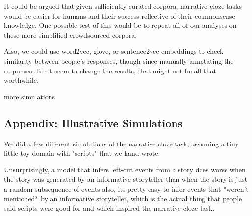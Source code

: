 \documentclass[10pt,a4paper]{article}
\newcommand{\todo}[1]{{\color{red}#1}}
\begin{document}
It could be argued that given sufficiently curated corpora, narrative cloze tasks would be easier for humans and their success reflective of their commonsense knowledge. One possible test of this would be to repeat all of our analyses on these more simplified crowdsourced corpora.

\todo{Also, we could use word2vec, glove, or sentence2vec embeddings to check similarity between people's responses, though since manually annotating the responses didn't seem to change the results, that might not be all that worthwhile.}

\todo{more simulations}





\setlength{\bibleftmargin}{.125in}
\setlength{\bibindent}{-\bibleftmargin}



\subsection{Appendix: Illustrative Simulations}

\todo{
We did a few different simulations of the narrative cloze task, assuming a tiny little toy domain with "scripts" that we hand wrote.

Unsurprisingly,
a model that infers left-out events from a story does worse when the story was generated by an informative storyteller than when the story is just a random subsequence of events
also, its pretty easy to infer events that *weren't mentioned* by an informative storyteller, which is the actual thing that people said scripts were good for and which inspired the narrative cloze task.
}
\end{document}
